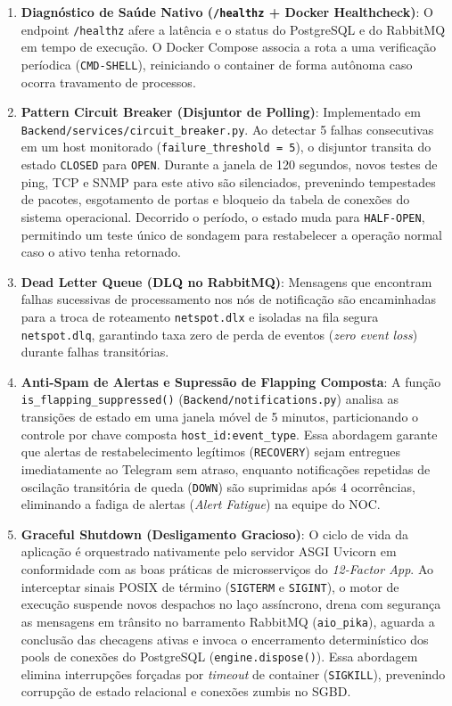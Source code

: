 \documentclass[12pt,a4paper]{article}
\begin{document}
\begin{enumerate}[leftmargin=1.25cm]
\item \textbf{Diagnóstico de Saúde Nativo (\texttt{/healthz} + Docker Healthcheck)}: O endpoint \texttt{/healthz} afere a latência e o status do PostgreSQL e do RabbitMQ em tempo de execução. O Docker Compose associa a rota a uma verificação períodica (\texttt{CMD-SHELL}), reiniciando o container de forma autônoma caso ocorra travamento de processos.
\item \textbf{Pattern Circuit Breaker (Disjuntor de Polling)}: Implementado em \texttt{Backend/services/circuit\_breaker.py}. Ao detectar 5 falhas consecutivas em um host monitorado (\texttt{failure\_threshold = 5}), o disjuntor transita do estado \texttt{CLOSED} para \texttt{OPEN}. Durante a janela de 120 segundos, novos testes de ping, TCP e SNMP para este ativo são silenciados, prevenindo tempestades de pacotes, esgotamento de portas e bloqueio da tabela de conexões do sistema operacional. Decorrido o período, o estado muda para \texttt{HALF-OPEN}, permitindo um teste único de sondagem para restabelecer a operação normal caso o ativo tenha retornado.
\item \textbf{Dead Letter Queue (DLQ no RabbitMQ)}: Mensagens que encontram falhas sucessivas de processamento nos nós de notificação são encaminhadas para a troca de roteamento \texttt{netspot.dlx} e isoladas na fila segura \texttt{netspot.dlq}, garantindo taxa zero de perda de eventos (\textit{zero event loss}) durante falhas transitórias.
\item \textbf{Anti-Spam de Alertas e Supressão de Flapping Composta}: A função \texttt{is\_flapping\_suppressed()} (\texttt{Backend/notifications.py}) analisa as transições de estado em uma janela móvel de 5 minutos, particionando o controle por chave composta \texttt{host\_id:event\_type}. Essa abordagem garante que alertas de restabelecimento legítimos (\texttt{RECOVERY}) sejam entregues imediatamente ao Telegram sem atraso, enquanto notificações repetidas de oscilação transitória de queda (\texttt{DOWN}) são suprimidas após 4 ocorrências, eliminando a fadiga de alertas (\textit{Alert Fatigue}) na equipe do NOC.
\item \textbf{Graceful Shutdown (Desligamento Gracioso)}: O ciclo de vida da aplicação é orquestrado nativamente pelo servidor ASGI Uvicorn em conformidade com as boas práticas de microsserviços do \textit{12-Factor App}. Ao interceptar sinais POSIX de término (\texttt{SIGTERM} e \texttt{SIGINT}), o motor de execução suspende novos despachos no laço assíncrono, drena com segurança as mensagens em trânsito no barramento RabbitMQ (\texttt{aio\_pika}), aguarda a conclusão das checagens ativas e invoca o encerramento determinístico dos pools de conexões do PostgreSQL (\texttt{engine.dispose()}). Essa abordagem elimina interrupções forçadas por \textit{timeout} de container (\texttt{SIGKILL}), prevenindo corrupção de estado relacional e conexões zumbis no SGBD.

\end{enumerate}
\end{document}
